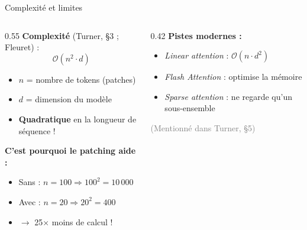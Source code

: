\documentclass[aspectratio=169, 11pt]{beamer}
\begin{document}
\begin{frame}{Complexité et limites}
\begin{columns}
\begin{column}{0.55\textwidth}
    \textbf{Complexité} (Turner, §3 ; Fleuret) :
    \[
    \mathcal{O}(n^2 \cdot d)
    \]
    \begin{itemize}
        \item $n$ = nombre de tokens (patches)
        \item $d$ = dimension du modèle
        \item \textbf{Quadratique} en la longueur de séquence !
    \end{itemize}
    
    \vspace{0.5em}
    \textbf{C'est pourquoi le patching aide :}
    \begin{itemize}
        \item Sans : $n = 100 \Rightarrow 100^2 = 10\,000$
        \item Avec : $n = 20 \Rightarrow 20^2 = 400$
        \item $\rightarrow$ 25$\times$ moins de calcul !
    \end{itemize}
\end{column}
\begin{column}{0.42\textwidth}
    \textbf{Pistes modernes :}
    \begin{itemize}
        \item \emph{Linear attention} : $\mathcal{O}(n \cdot d^2)$
        \item \emph{Flash Attention} : optimise la mémoire
        \item \emph{Sparse attention} : ne regarde qu'un sous-ensemble
    \end{itemize}
    
    \vspace{0.5em}
    \textcolor{gray}{(Mentionné dans Turner, §5)}
\end{column}
\end{columns}
\end{frame}

\end{document}
